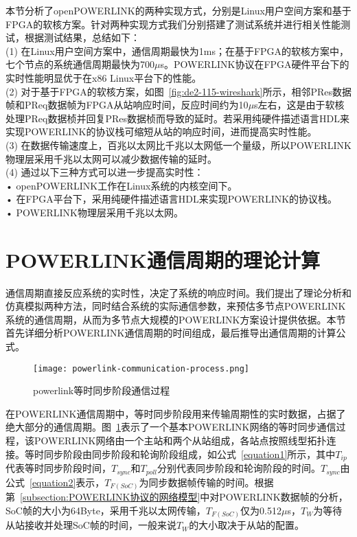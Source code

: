 本节分析了openPOWERLINK的两种实现方式，分别是Linux用户空间方案和基于FPGA的软核方案。针对两种实现方式我们分别搭建了测试系统并进行相关性能测试，根据测试结果，总结如下：\\
(1) 在Linux用户空间方案中，通信周期最快为1ms；在基于FPGA的软核方案中，七个节点的系统通信周期最快为700$\mu$s。POWERLINK协议在FPGA硬件平台下的实时性能明显优于在x86 Linux平台下的性能。\\
(2) 对于基于FPGA的软核方案，如图~\ref{fig:de2-115-wireshark}所示，相邻PRes数据帧和PReq数据帧为FPGA从站响应时间，反应时间约为10$\mu$s左右，这是由于软核处理PReq数据桢并回复PRes数据桢而导致的延时。若采用纯硬件描述语言HDL来实现POWERLINK的协议栈可缩短从站的响应时间，进而提高实时性能。\\
(3) 在数据传输速度上，百兆以太网比千兆以太网低一个量级，所以POWERLINK物理层采用千兆以太网可以减少数据传输的延时。\\
(4) 通过以下三种方式可以进一步提高实时性：\\
        • openPOWERLINK工作在Linux系统的内核空间下。\\
        • 在FPGA平台下，采用纯硬件描述语言HDL来实现POWERLINK的协议栈。\\
        • POWERLINK物理层采用千兆以太网。

\section{POWERLINK通信周期的理论计算}
\label{section:理论计算POWERLINK通信周期}
通信周期直接反应系统的实时性，决定了系统的响应时间。我们提出了理论分析和仿真模拟两种方法，同时结合系统的实际通信参数，来预估多节点POWERLINK系统的通信周期，从而为多节点大规模的POWERLINK方案设计提供依据。本节首先详细分析POWERLINK通信周期的时间组成，最后推导出通信周期的计算公式\cite{Knezic2017}。

\begin{figure}[!htb]
  \centering
  \texttt{[image: powerlink-communication-process.png]}
  \caption{powerlink等时同步阶段通信过程}
  \label{fig:powerlink-communication-process}
\end{figure}

在POWERLINK通信周期中，等时同步阶段用来传输周期性的实时数据，占据了绝大部分的通信周期。图~\ref{fig:powerlink-communication-process}表示了一个基本POWERLINK网络的等时同步通信过程，该POWERLINK网络由一个主站和两个从站组成，各站点按照线型拓扑连接。等时同步阶段由同步阶段和轮询阶段组成，如公式~\ref{equation1}所示，其中$T_{ip}$代表等时同步阶段时间，$T_{sync}$和$T_{poll}$分别代表同步阶段和轮询阶段的时间。$T_{sync}$由公式~\ref{equation2}表示，$T_{F(SoC)}$为同步数据帧传输的时间。根据第~\ref{subsection:POWERLINK协议的网络模型}中对POWERLINK数据帧的分析，SoC帧的大小为64Byte，采用千兆以太网传输，$T_{F(SoC)}$仅为0.512$\mu$s，$T_{W}$为等待从站接收并处理SoC帧的时间，一般来说$T_{W}$的大小取决于从站的配置。

